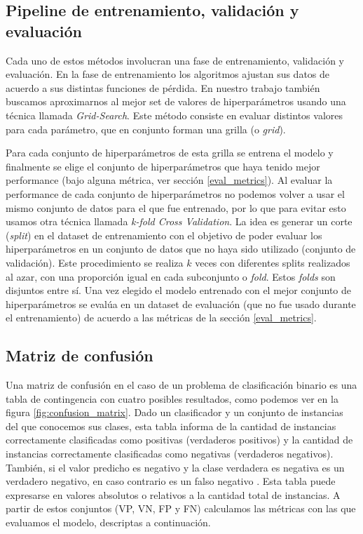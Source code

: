 \subsection{Pipeline de entrenamiento, validación y evaluación} \label{pipeline}

Cada uno de estos métodos involucran una fase de entrenamiento, validación y evaluación. En la fase de entrenamiento los algoritmos ajustan sus datos de acuerdo a sus distintas funciones de pérdida. En nuestro trabajo también buscamos aproximarnos al mejor set de valores de hiperparámetros usando una técnica llamada \textit{Grid-Search}. Este método consiste en evaluar distintos valores para cada parámetro, que en conjunto forman una grilla (o \textit{grid}). 

Para cada conjunto de hiperparámetros de esta grilla se entrena el modelo y finalmente se elige el conjunto de hiperparámetros que haya tenido mejor performance (bajo alguna métrica, ver sección \ref{eval_metrics}). Al evaluar la performance de cada conjunto de hiperparámetros no podemos volver a usar el mismo conjunto de datos para el que fue entrenado, por lo que para evitar esto usamos otra técnica llamada \textit{k-fold Cross Validation}. La idea es generar un corte (\textit{split}) en el dataset de entrenamiento con el objetivo de poder evaluar los hiperparámetros en un conjunto de datos que no haya sido utilizado (conjunto de validación). Este procedimiento se realiza $k$ veces con diferentes splits realizados al azar, con una proporción igual en cada subconjunto o \textit{fold}. Estos \textit{folds} son disjuntos entre sí. Una vez elegido el modelo entrenado con el mejor conjunto de hiperparámetros se evalúa en un dataset de evaluación (que no fue usado durante el entrenamiento) de acuerdo a las métricas de la sección \ref{eval_metrics}.

\newpage

\subsection{Matriz de confusión} \label{confusion_matrix}

Una matriz de confusión en el caso de un problema de clasificación binario es una tabla de contingencia con cuatro posibles resultados, como podemos ver en la figura \ref{fig:confusion_matrix}. Dado un clasificador y un conjunto de instancias del que conocemos sus clases, esta tabla informa de la cantidad de instancias correctamente clasificadas como positivas (verdaderos positivos) y la cantidad de instancias correctamente clasificadas como negativas (verdaderos negativos). También, si el valor predicho es negativo y la clase verdadera es negativa es un verdadero negativo, en caso contrario es un falso negativo \cite{Fawcett2006}. Esta tabla puede expresarse en valores absolutos o relativos a la cantidad total de instancias. A partir de estos conjuntos (VP, VN, FP y FN) calculamos las métricas con las que evaluamos el modelo, descriptas a continuación.

